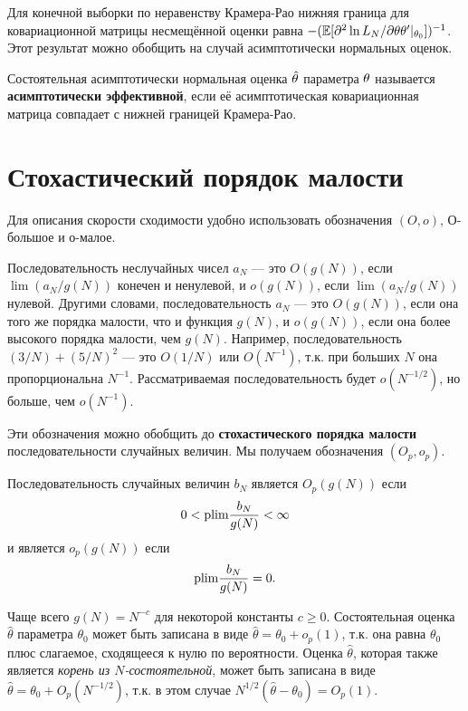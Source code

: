 Для конечной выборки по неравенству Крамера-Рао нижняя граница для ковариационной матрицы несмещённой оценки равна $-(\mathbb{E}[\partial^2 \ln L_N/\partial \mathbf{\theta}\mathbf{\theta}' |_{\mathbf{\theta}_0}])^{-1}$. Этот результат можно обобщить на случай асимптотически нормальных оценок.

\begin{definition}
\label{def:A21}
	Состоятельная асимптотически нормальная оценка $\hat{\mathbf{\theta}}$ параметра $\mathbf{\theta}$ называется \textbf{асимптотически эффективной}, если её асимптотическая ковариационная матрица совпадает с нижней границей Крамера-Рао. 
\end{definition}

\section{Стохастический порядок малости}

Для описания скорости сходимости удобно использовать обозначения $(O,o)$, О-большое и о-малое.

Последовательность неслучайных чисел $a_N$ --- это $O(g(N))$, если $\lim (a_N/g(N))$ конечен и ненулевой, и $o(g(N))$, если $\lim (a_N/g(N))$ нулевой. Другими словами, последовательность $a_N$ --- это $O(g(N))$, если она того же порядка малости, что и функция $g(N)$, и $o(g(N))$, если она более высокого порядка малости, чем $g(N)$. Например, последовательность $(3/N)+(5/N)^2$ --- это $O(1/N)$ или $O(N^{-1})$, т.к. при больших $N$ она пропорциональна $N^{-1}$. Рассматриваемая последовательность будет $o(N^{-1/2})$, но больше, чем $o(N^{-1})$.

Эти обозначения можно обобщить до \textbf{стохастического порядка малости} последовательности случайных величин. Мы получаем обозначения $(O_p,o_p)$.

\begin{definition}
\label{def:A22}
	Последовательность случайных величин $b_N$ является $O_p(g(N))$ если
	\[
	0<\mathrm{plim } \frac{b_N}{g(N)}<\infty
	\]
	и является $o_p(g(N))$ если 
	\[
	\mathrm{plim } \frac{b_N}{g(N)}=0.
	\]
\end{definition}

Чаще всего $g(N)=N^{-c}$ для некоторой константы $c\geq 0$. Состоятельная оценка $\hat{\theta}$ параметра $\theta_0$ может быть записана в виде $\hat{\theta}=\theta_0+o_p(1)$, т.к. она равна $\theta_0$ плюс слагаемое, сходящееся к нулю по вероятности. Оценка $\hat{\theta}$, которая также является \textit{корень из $N$-состоятельной}, может быть записана в виде $\hat{\theta}=\theta_0+O_p(N^{-1/2})$, т.к. в этом случае $N^{1/2}(\hat{\theta}-\theta_0)=O_p(1)$.


